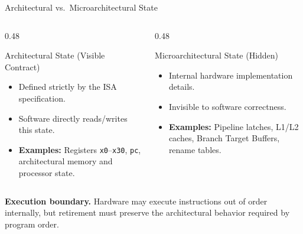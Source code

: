 \documentclass[aspectratio=169,11pt,t,xcolor=table]{beamer}
\newcommand{\key}[1]{\textbf{#1}}
\newcommand{\bits}[1]{\texttt{#1}}
\begin{document}
\begin{frame}{Architectural vs.\ Microarchitectural State}
\vfill
\begin{columns}[T]
\begin{column}{0.48\textwidth}
\begin{block}{Architectural State (Visible Contract)}
\small
\begin{itemize}\setlength{\itemsep}{3pt}
  \item Defined strictly by the ISA specification.
  \item Software directly reads/writes this state.
  \item \key{Examples:} Registers \bits{x0}--\bits{x30}, \bits{pc}, architectural memory and processor state.
\end{itemize}
\end{block}
\end{column}

\begin{column}{0.48\textwidth}
\begin{block}{Microarchitectural State (Hidden)}
\small
\begin{itemize}\setlength{\itemsep}{3pt}
  \item Internal hardware implementation details.
  \item Invisible to software correctness.
  \item \key{Examples:} Pipeline latches, L1/L2 caches, Branch Target Buffers, rename tables.
\end{itemize}
\end{block}
\end{column}
\end{columns}

\vfill
\small
\textbf{Execution boundary.} Hardware may execute instructions out of order internally, but retirement must preserve the architectural behavior required by program order.
\vfill
\end{frame}









\end{document}
